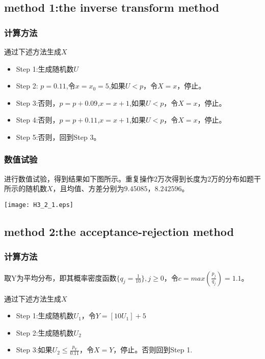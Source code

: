 \documentclass{ctexart}
\begin{document}
\subsection{method 1:the inverse transform method}
 \subsubsection{计算方法}
通过下述方法生成\(X\)

\begin{itemize} 
\item Step 1:生成随机数\(U\)
\item Step 2: \(p=0.11\),令\(x=x_0=5\),如果\(U < p\)，令\(X=x\)，停止。

\item Step 3:否则，\(p = p+0.09\),\(x=x+1\),如果\(U < p\)，令\(X=x\)，停止。
\item Step 4:否则，\(p = p+0.11\),\(x=x+1\),如果\(U < p \)，令\(X=x\)，停止。
\item Step 5:否则，回到Step 3。
\end{itemize}


\subsubsection{数值试验}

进行数值试验，得到结果如下图所示。重复操作2万次得到长度为2万的分布如题干所示的随机数\(X\)，且均值、方差分别为\(9.45085，8.242596\)。

\centerline{\texttt{[image: H3\_2\_1.eps]}}


\subsection{method 2:the acceptance-rejection method}
 \subsubsection{计算方法}
取Y为平均分布，即其概率密度函数\(\{q_j=\frac{1}{10}\},j \geq 0\)，令\(c = max(\frac{p_j}{q_j})=1.1\)。

通过下述方法生成\(X\)
\begin{itemize} 
\item Step 1:生成随机数\(U_1\)，令\(Y=[10U_1]+5\)
\item Step 2:生成随机数\(U_2\)
\item Step 3:如果\(U_2 \leq \frac{p_Y}{0.11}\)，令\(X=Y\)，停止。否则回到Step 1.
\end{itemize}
\end{document}
